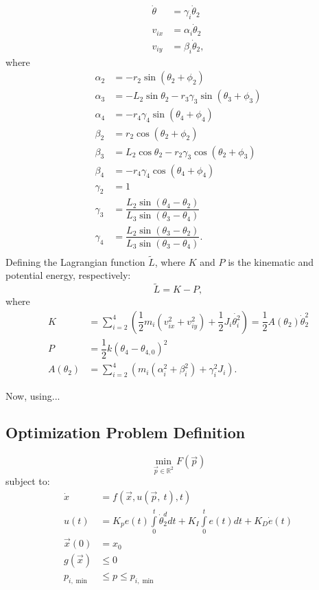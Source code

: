 \documentclass[12pt,letterpape]{article}
\begin{document}
\begin{align}
	\dot{ \theta } &= \gamma_i \dot{\theta}_2\\
	v_{ix} &= \alpha_i \dot{\theta}_2\\
	v_{iy} &= \beta_i \dot{\theta}_2,
\end{align}
% 
where
\begin{align}
	\alpha_2 &= -r_2\sin( \theta_2 + \phi_2 )\\
	\alpha_3 &= -L_2\sin\theta_2  -r_3 \gamma_3 \sin(\theta_3 + \phi_3)  \\
	\alpha_4 &= -r_4 \gamma_4 \sin( \theta_4 + \phi_4 ) \\
	\beta_2 &= r_2 \cos(\theta_2 + \phi_2) \\
	\beta_3 &= L_2 \cos\theta_2 - r_2 \gamma_3 \cos( \theta_2 + \phi_3 ) \\
	\beta_4 &= -r_4 \gamma_4 \cos(\theta_4 + \phi_4) \\
	\gamma_2 &= 1 \\
	\gamma_3 &= \dfrac{L_2 \sin( \theta_4 - \theta_2 ) }{L_3 \sin( \theta_3 - \theta_4 ) } \\
	\gamma_4 &= \dfrac{L_2 \sin( \theta_3 - \theta_2 ) }{L_3 \sin( \theta_3 - \theta_4 ) }. \\
\end{align}
% 
Defining the Lagrangian function $\tilde{L}$, where $K$ and $P$ is the kinematic
and potential energy, respectively:
$$
	\tilde{L} = K- P,
$$
% 
where
%
\begin{align}
	K &= \sum_{i=2}^4  \left( \dfrac{1}{2} m_i ( v^2_{ix} + v^2_{iy} )
		+ \dfrac{1}{2} J_i \dot{ \theta_i^2 }  \right) = \dfrac{1}{2} A(\theta_2) \dot{\theta}_2^2  \\
	P &= \dfrac{1}{2}k (\theta_4 - \theta_{4,0})^2  \\ 
	A( \theta_2 ) &= \sum_{i=2}^4 ( m_i (\alpha_i^2 + \beta_i^2) + \gamma_i^2 J_i ).
\end{align}

Now, using...

\subsection{Optimization Problem Definition} %
\label{sec:optimization_problem_definition}

\begin{equation}
	\min_{\vec{p} \in \mathbb{R}^2} F( \vec{p} ) 
\end{equation}
% 
subject to:
% 
% 
\begin{align}
	\dot{x}  & = f( \vec{x}, u( \vec{p},\ t ), t ) \\
	   u(t)  & = K_{p} e(t) \int\limits_{0}^{t} \dot{\theta}_2^d dt 
	   			+ K_I\int\limits_{0}^{t} e(t) dt + K_D \dot{e}(t) \\
  \vec{x}(0) & = x_0 \\
  g(\vec{x}) & \leq 0 \\
  p_{i,\min} & \leq p \leq p_{i,\min}
\end{align}
\end{document}
